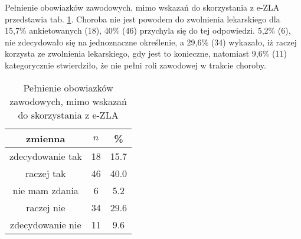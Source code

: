  Pełnienie obowiazków zawodowych, mimo wskazań do skorzystania z e-ZLA przedstawia tab. \ref{tab:Q32}. Choroba nie jest powodem do zwolnienia lekarskiego dla 15,7\% ankietowanych (18), 40\% (46) przychyla się do tej odpowiedzi. 5,2\% (6), nie zdecydowało się na jednoznaczne określenie, a 29,6\% (34) wykazało, iż raczej korzysta ze zwolnienia lekarskiego, gdy jest to konieczne, natomiast 9,6\% (11) kategorycznie stwierdziło, że nie pełni roli zawodowej w trakcie choroby.

\begin{table}[H]
\caption{Pełnienie obowiazków zawodowych, mimo wskazań do skorzystania z e-ZLA}
\centering
\begin{tabular}{ | c | c | c |}
\hline
zmienna & $n$ & \% \\
\hline
zdecydowanie tak  &  18  & 15.7 \\
\hline
raczej tak  &  46  & 40.0 \\
\hline
nie mam zdania  &  6  & 5.2 \\
\hline
raczej nie  &  34  & 29.6 \\
\hline
zdecydowanie nie  &  11  & 9.6 \\
\hline
\end{tabular}
\label{tab:Q32}
\end{table}
